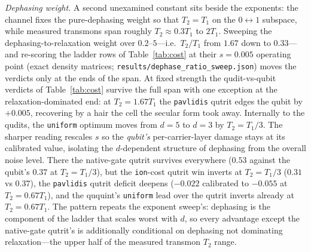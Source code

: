 \documentclass[aps,pra,reprint,superscriptaddress,nofootinbib,floatfix]{revtex4-2}
\begin{document}
\emph{Dephasing weight.} A second unexamined constant sits beside the
exponents: the channel fixes the pure-dephasing weight so that
$T_2=T_1$ on the $0{\leftrightarrow}1$ subspace, while measured
transmons span roughly $T_2\approx0.3T_1$ to $2T_1$. Sweeping the
dephasing-to-relaxation weight over $0.2$--$5$---i.e.\ $T_2/T_1$ from
$1.67$ down to $0.33$---and re-scoring the ladder rows of
Table~\ref{tab:cost} at their $s=0.005$ operating point
(exact density matrices;
\texttt{results/dephase\_ratio\_sweep.json}) moves the verdicts only
at the ends of the span. At fixed strength the
qudit-vs-qubit verdicts of Table~\ref{tab:cost} survive the full
span with one exception at the relaxation-dominated end: at
$T_2=1.67T_1$ the \texttt{pavlidis} qutrit edges the qubit by
$+0.005$, recovering by a hair the cell the secular form took away.
Internally to the qudits, the \texttt{uniform} optimum
moves from $d=5$ to $d=3$ by $T_2=T_1/3$. The sharper reading rescales $s$ so the
\emph{qubit's} per-carrier-layer damage stays at its calibrated
value, isolating the $d$-dependent structure of dephasing from the
overall noise level. There the native-gate qutrit survives everywhere
($0.53$ against the qubit's $0.37$ at $T_2=T_1/3$), but the
\texttt{ion}-cost qutrit win inverts at $T_2=T_1/3$ ($0.31$ vs
$0.37$), the \texttt{pavlidis} qutrit deficit deepens
($-0.022$ calibrated to $-0.055$ at
$T_2=0.67T_1$), and the ququint's \texttt{uniform} lead over the
qutrit inverts already at $T_2=0.67T_1$. The pattern repeats the exponent
sweep's: dephasing is the component of the ladder that scales worst
with $d$, so every advantage except the native-gate qutrit's is
additionally conditional on dephasing not dominating
relaxation---the upper half of the measured transmon $T_2$ range.
\end{document}
